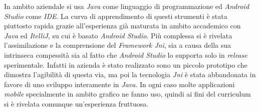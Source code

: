 In ambito aziendale si usa \emph{Java} come linguaggio di programmazione ed \emph{Android Studio} come \emph{IDE}. La curva di apprendimento di questi strumenti è stata piuttosto rapida grazie all'esperienza già maturata in ambito accademico con \emph{Java} ed \emph{ItelliJ}, su cui è basato \emph{Android Studio}. Più complessa si è rivelata l'assimilazione e la comprensione del \emph{Framework Jni}, sia a causa della sua intrinseca compessità sia al fatto che \emph{Android Studio} lo supporta solo in \emph{release} sperimentale. Infatti in azienda è stato realizzato sono un piccolo prototipo che dimostra l'agibilità di questa via, ma poi la tecnologia \emph{Jni} è stata abbandonata in favore di uno sviluppo interamente in \emph{Java}. In ogni caso molte applicazioni \emph{mobile} specialmente in ambito grafico ne fanno uso, quindi ai fini del curriculum si è rivelata comunque un'esperienza fruttuosa.










